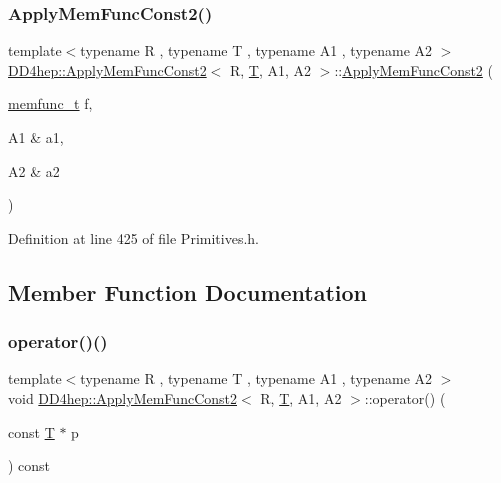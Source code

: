 \subsubsection{\texorpdfstring{Apply\+Mem\+Func\+Const2()}{ApplyMemFuncConst2()}}
{\footnotesize\ttfamily template$<$typename R , typename T , typename A1 , typename A2 $>$ \\
\hyperlink{struct_d_d4hep_1_1_apply_mem_func_const2}{D\+D4hep\+::\+Apply\+Mem\+Func\+Const2}$<$ R, \hyperlink{class_t}{T}, A1, A2 $>$\+::\hyperlink{struct_d_d4hep_1_1_apply_mem_func_const2}{Apply\+Mem\+Func\+Const2} (\begin{DoxyParamCaption}\item[{\hyperlink{struct_d_d4hep_1_1_apply_mem_func_const2_ac0e4dae57560aa3d5f8d489605c714e3}{memfunc\+\_\+t}}]{f,  }\item[{A1 \&}]{a1,  }\item[{A2 \&}]{a2 }\end{DoxyParamCaption})\hspace{0.3cm}{\ttfamily [inline]}}



Definition at line 425 of file Primitives.\+h.



\subsection{Member Function Documentation}
\hypertarget{struct_d_d4hep_1_1_apply_mem_func_const2_a9b8cc42f29b3dbad081e62371ee77f63}{}\label{struct_d_d4hep_1_1_apply_mem_func_const2_a9b8cc42f29b3dbad081e62371ee77f63} 
\subsubsection{\texorpdfstring{operator()()}{operator()()}}
{\footnotesize\ttfamily template$<$typename R , typename T , typename A1 , typename A2 $>$ \\
void \hyperlink{struct_d_d4hep_1_1_apply_mem_func_const2}{D\+D4hep\+::\+Apply\+Mem\+Func\+Const2}$<$ R, \hyperlink{class_t}{T}, A1, A2 $>$\+::operator() (\begin{DoxyParamCaption}\item[{const \hyperlink{class_t}{T} $\ast$}]{p }\end{DoxyParamCaption}) const\hspace{0.3cm}{\ttfamily [inline]}}



